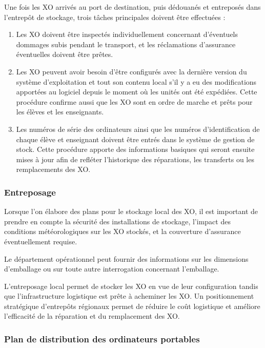 \documentclass[12pt]{article}
\begin{document}
Une fois les XO arrivés au port de destination, puis dédouanés et
entreposés dans l’entrepôt de stockage, trois tâches principales doivent
être effectuées :

\begin{enumerate}
\item Les XO doivent être inspectés individuellement concernant d'éventuels
   dommages subis pendant le transport, et les réclamations d'assurance
   éventuelles doivent être prêtes.
\item Les XO peuvent avoir besoin d’être configurés avec la dernière version
   du système d'exploitation et tout son contenu local s'il y a eu des
   modifications apportées au logiciel depuis le moment où les unités ont
   été expédiées. Cette procédure confirme aussi que les XO sont en ordre
   de marche et prêts pour les élèves et les enseignants.
\item Les numéros de série des ordinateurs ainsi que les numéros
   d'identification de chaque élève et enseignant doivent être entrés dans
   le système de gestion de stock. Cette procédure apporte des informations
   basiques qui seront ensuite mises à jour afin de refléter l'historique
   des réparations, les transferts ou les remplacements des XO.
\end{enumerate}
\subsubsection{Entreposage}
\label{sec-9-1-1}



Lorsque l'on élabore des plans pour le stockage local des XO, il est
important de prendre en compte la sécurité des installations de stockage,
l'impact des conditions météorologiques sur les XO stockés, et la
couverture d'assurance éventuellement requise.

Le département opérationnel peut fournir des informations sur les
dimensions d'emballage ou sur toute autre interrogation concernant
l’emballage.

L’entreposage local permet de stocker les XO en vue de leur configuration
tandis que l’infrastructure logistique est prête à acheminer les XO. Un
positionnement stratégique d’entrepôts régionaux permet de réduire le coût
logistique et améliore l'efficacité de la réparation et du remplacement des
XO.
\subsubsection{Plan de distribution des ordinateurs portables}
\label{sec-9-1-2}
\end{document}
